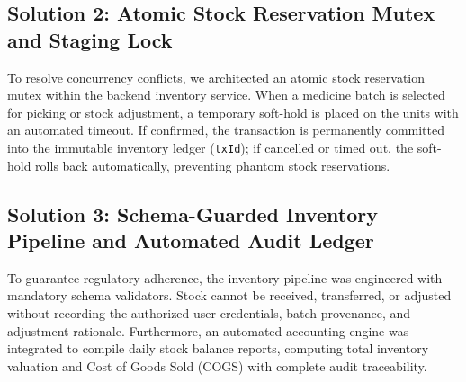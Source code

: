 \subsection{Solution 2: Atomic Stock Reservation Mutex and Staging Lock}
To resolve concurrency conflicts, we architected an atomic stock reservation mutex within the backend inventory service. When a medicine batch is selected for picking or stock adjustment, a temporary soft-hold is placed on the units with an automated timeout. If confirmed, the transaction is permanently committed into the immutable inventory ledger (\texttt{txId}); if cancelled or timed out, the soft-hold rolls back automatically, preventing phantom stock reservations.

\subsection{Solution 3: Schema-Guarded Inventory Pipeline and Automated Audit Ledger}
To guarantee regulatory adherence, the inventory pipeline was engineered with mandatory schema validators. Stock cannot be received, transferred, or adjusted without recording the authorized user credentials, batch provenance, and adjustment rationale. Furthermore, an automated accounting engine was integrated to compile daily stock balance reports, computing total inventory valuation and Cost of Goods Sold (COGS) with complete audit traceability.
